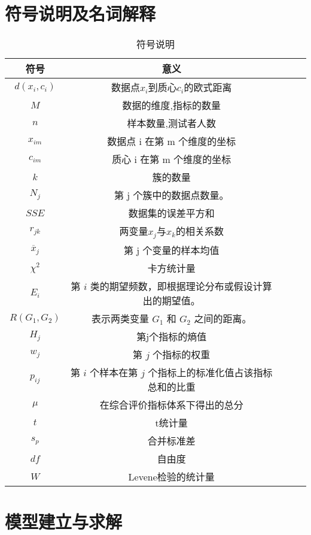 \documentclass[withoutpreface,bwprint]{cumcmthesis} %
\begin{document}
\section{符号说明及名词解释}
\begin{table}[!htbp]
    \caption{符号说明}\label{tab:001}  \centering
    \begin{tabular}{ccccc}
        \toprule[1.5pt]
        符号 & 意义  \\
        \midrule[1pt]
        $d(x_i, c_i)$ & 数据点$x_i$到质心$c_i$的欧式距离 \\  
        $M$ & 数据的维度,指标的数量 \\   
        \( n \) & 样本数量,测试者人数\\
        $x_{im}$ & 数据点 i 在第 m 个维度的坐标 \\
        $c_{im}$ & 质心 i 在第 m 个维度的坐标 \\
        $k$ & 簇的数量 \\
        $N_j$ &  第 j 个簇中的数据点数量。 \\
        $SSE$ & 数据集的误差平方和 \\
        $r_{jk}$ & 两变量$x_j$与$x_k$的相关系数\\
        $\overline{x}_j $ & 第 j 个变量的样本均值 \\
        $ \chi^2 $ & 卡方统计量\\
        $ E_i $ & 第 \(i\) 类的期望频数，即根据理论分布或假设计算出的期望值。\\
        $ R(G_1, G_2) $ & 表示两类变量 \( G_1 \) 和 \( G_2 \) 之间的距离。\\
        $ H_j $ &  第j个指标的熵值 \\
        \( w_j \) & 第 \( j \) 个指标的权重\\
        \( p_{ij} \) & 第 \( i \) 个样本在第 \( j \) 个指标上的标准化值占该指标总和的比重\\
        $ \mu $ & 在综合评价指标体系下得出的总分 \\
        $ t $ & t统计量\\
        $ s_p $  & 合并标准差 \\
        $ df $ & 自由度\\
        $ W $ & Levene检验的统计量 \\
        \bottomrule[1.5pt]
    \end{tabular}
\end{table}

\section{模型建立与求解}
\end{document}
